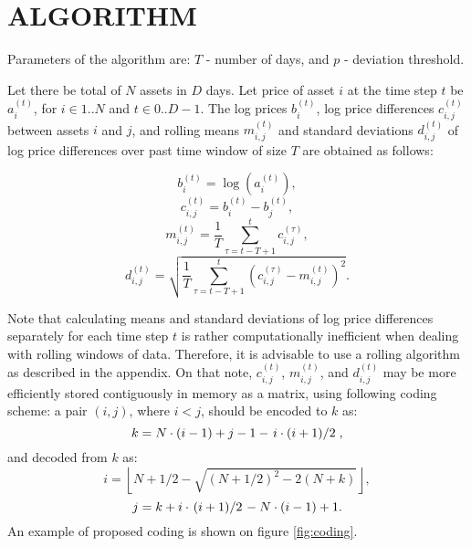 \documentclass[letterpaper, 10 pt, conference]{ieeeconf}
\begin{document}
  \section{ALGORITHM} 
  
  Parameters of the algorithm are: $T$ - number of days, and $p$ - deviation threshold.
  
  Let there be total of $N$ assets in $D$ days.
  Let price of asset $i$ at the time step $t$ be $a_i^{(t)}$, for $i \in 1..N$ and $t \in 0..D-1$.
  The log prices $b_i^{(t)}$, log price differences $c_{i,j}^{(t)}$ between assets $i$ and $j$, and rolling means $m_{i,j}^{(t)}$ and standard deviations $d_{i,j}^{(t)}$ of log price differences over past time window of size $T$ are obtained as follows:
  
  \begin{equation} b_i^{(t)} = \log\left(a_i^{(t)}\right), \end{equation}
  \begin{equation} c_{i,j}^{(t)} = b_i^{(t)} - b_j^{(t)}, \end{equation}
  \begin{equation} m_{i,j}^{(t)} = \frac{1}{T}\sum_{\tau=t-T+1}^{t} c_{i,j}^{(\tau)} \label{eq:m}, \end{equation}
  \begin{equation} d_{i,j}^{(t)} = \sqrt{\frac{1}{T}\sum_{\tau=t-T+1}^{t} \left(c_{i,j}^{(\tau)} - m_{i,j}^{(t)} \right)^2} \label{eq:d}. \end{equation}
  
  Note that calculating means and standard deviations of log price differences separately for each time step $t$ is rather computationally inefficient when dealing with rolling windows of data.
  Therefore, it is advisable to use a rolling algorithm as described in the appendix.
  On that note, $c_{i,j}^{(t)}$, $m_{i,j}^{(t)}$, and $d_{i,j}^{(t)}$ may be more efficiently stored contiguously in memory as a matrix, using following coding scheme: a pair $(i, j)$, where $i < j$, should be encoded to $k$ as:
  \begin{equation} k = N \cdot (i - 1) + j - 1 - \left. i \cdot (i + 1) \middle/ 2\right., \end{equation}
  and decoded from $k$ as:
  \begin{equation} i = \left\lfloor N + 1/2 - \sqrt{(N + 1/2)^2 - 2(N + k)} \right\rfloor, \end{equation}
  \begin{equation} j = k + i \cdot \left.(i + 1) \middle/ 2\right. - N \cdot (i - 1) + 1. \end{equation}
  An example of proposed coding is shown on figure \ref{fig:coding}.
  
\end{document}
